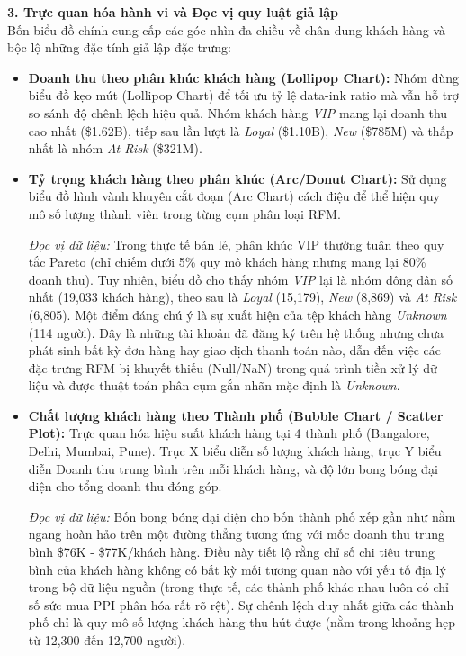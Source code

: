 \textbf{3. Trực quan hóa hành vi và Đọc vị quy luật giả lập} \\
Bốn biểu đồ chính cung cấp các góc nhìn đa chiều về chân dung khách hàng và bộc lộ những đặc tính giả lập đặc trưng:
\begin{itemize}
    \item \textbf{Doanh thu theo phân khúc khách hàng (Lollipop Chart):} 
    Nhóm dùng biểu đồ kẹo mút (Lollipop Chart) để tối ưu tỷ lệ data-ink ratio \cite{tufte2001} mà vẫn hỗ trợ so sánh độ chênh lệch hiệu quả. Nhóm khách hàng \textit{VIP} mang lại doanh thu cao nhất (\$1.62B), tiếp sau lần lượt là \textit{Loyal} (\$1.10B), \textit{New} (\$785M) và thấp nhất là nhóm \textit{At Risk} (\$321M).
    
    \item \textbf{Tỷ trọng khách hàng theo phân khúc (Arc/Donut Chart):} 
    Sử dụng biểu đồ hình vành khuyên cắt đoạn (Arc Chart) cách điệu để thể hiện quy mô số lượng thành viên trong từng cụm phân loại RFM. 
    
    \textit{Đọc vị dữ liệu:} Trong thực tế bán lẻ, phân khúc VIP thường tuân theo quy tắc Pareto (chỉ chiếm dưới 5\% quy mô khách hàng nhưng mang lại 80\% doanh thu). Tuy nhiên, biểu đồ cho thấy nhóm \textit{VIP} lại là nhóm đông dân số nhất (19,033 khách hàng), theo sau là \textit{Loyal} (15,179), \textit{New} (8,869) và \textit{At Risk} (6,805). Một điểm đáng chú ý là sự xuất hiện của tệp khách hàng \textit{Unknown} (114 người). Đây là những tài khoản đã đăng ký trên hệ thống nhưng chưa phát sinh bất kỳ đơn hàng hay giao dịch thanh toán nào, dẫn đến việc các đặc trưng RFM bị khuyết thiếu (Null/NaN) trong quá trình tiền xử lý dữ liệu và được thuật toán phân cụm gắn nhãn mặc định là \textit{Unknown}.
    
    \item \textbf{Chất lượng khách hàng theo Thành phố (Bubble Chart / Scatter Plot):} 
    Trực quan hóa hiệu suất khách hàng tại 4 thành phố (Bangalore, Delhi, Mumbai, Pune). Trục X biểu diễn số lượng khách hàng, trục Y biểu diễn Doanh thu trung bình trên mỗi khách hàng, và độ lớn bong bóng đại diện cho tổng doanh thu đóng góp.
    
    \textit{Đọc vị dữ liệu:} Bốn bong bóng đại diện cho bốn thành phố xếp gần như nằm ngang hoàn hảo trên một đường thẳng tương ứng với mốc doanh thu trung bình \$76K - \$77K/khách hàng. Điều này tiết lộ rằng chỉ số chi tiêu trung bình của khách hàng không có bất kỳ mối tương quan nào với yếu tố địa lý trong bộ dữ liệu nguồn (trong thực tế, các thành phố khác nhau luôn có chỉ số sức mua PPI phân hóa rất rõ rệt). Sự chênh lệch duy nhất giữa các thành phố chỉ là quy mô số lượng khách hàng thu hút được (nằm trong khoảng hẹp từ 12,300 đến 12,700 người).
    

\end{itemize}

